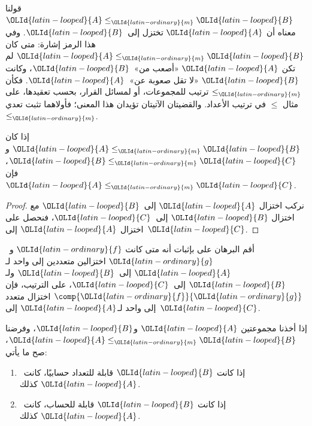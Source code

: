 \documentclass[../../../include/open-logic-section]{subfiles}
\begin{document}

قولنا $\OLId{latin-looped}{A}\leq_\OLId{latin-ordinary}{m} \OLId{latin-looped}{B}$ معناه أن $\OLId{latin-looped}{A}$ تختزل إلى~$\OLId{latin-looped}{B}$. وفي هذا الرمز إشارة:
متى كان $\OLId{latin-looped}{A}\leq_\OLId{latin-ordinary}{m} \OLId{latin-looped}{B}$ لم تكن $\OLId{latin-looped}{A}$ «أصعب من»~$\OLId{latin-looped}{B}$، وكانت $\OLId{latin-looped}{B}$ «لا تقل
صعوبة عن»~$\OLId{latin-looped}{A}$. فكأن $\le_\OLId{latin-ordinary}{m}$ ترتيب للمجموعات، أو لمسائل القرار، بحسب
تعقيدها، على مثال $\le$ في ترتيب الأعداد. والقضيتان الآتيتان تؤيدان هذا
المعنى؛ فأولاهما تثبت تعدي $\le_\OLId{latin-ordinary}{m}$.

\begin{prop}
إذا كان $\OLId{latin-looped}{A}\leq_\OLId{latin-ordinary}{m} \OLId{latin-looped}{B}$ و$\OLId{latin-looped}{B}\leq_\OLId{latin-ordinary}{m} \OLId{latin-looped}{C}$، فإن $\OLId{latin-looped}{A}\leq_\OLId{latin-ordinary}{m} \OLId{latin-looped}{C}$.
\end{prop}

\begin{proof}
نركب اختزال $\OLId{latin-looped}{A}$ إلى~$\OLId{latin-looped}{B}$ مع اختزال $\OLId{latin-looped}{B}$ إلى~$\OLId{latin-looped}{C}$، فنحصل على اختزال $\OLId{latin-looped}{A}$
إلى~$\OLId{latin-looped}{C}$.
\end{proof}

\begin{prob}
أقم البرهان على  بإثبات أنه متى كانت $\OLId{latin-ordinary}{f}$ و~$\OLId{latin-ordinary}{g}$ اختزالين
متعددين إلى واحد لـ$\OLId{latin-looped}{A}$ إلى~$\OLId{latin-looped}{B}$ ولـ$\OLId{latin-looped}{B}$ إلى~$\OLId{latin-looped}{C}$، على الترتيب، فإن
$\comp{\OLId{latin-ordinary}{f}}{\OLId{latin-ordinary}{g}}$ اختزال متعدد إلى واحد لـ$\OLId{latin-looped}{A}$ إلى~$\OLId{latin-looped}{C}$.
\end{prob}

\begin{prop}
إذا أخذنا مجموعتين $\OLId{latin-looped}{A}$ و$\OLId{latin-looped}{B}$، وفرضنا $\OLId{latin-looped}{A}\leq_\OLId{latin-ordinary}{m} \OLId{latin-looped}{B}$، صح ما يأتي:
\begin{enumerate}
\item إذا كانت $\OLId{latin-looped}{B}$ قابلة للتعداد حسابيًا، كانت~$\OLId{latin-looped}{A}$ كذلك.
\item إذا كانت $\OLId{latin-looped}{B}$ قابلة للحساب، كانت~$\OLId{latin-looped}{A}$ كذلك.
\end{enumerate}
\end{prop}
\end{document}
